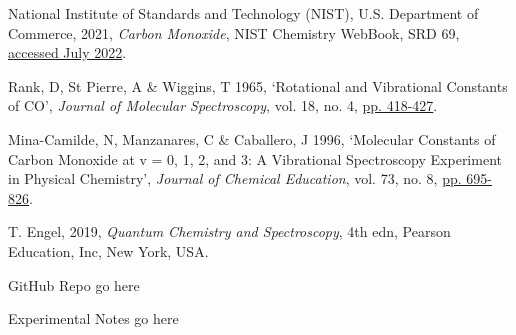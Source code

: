 \documentclass[aps,prl,reprint,10pt,amsmath,amssymb,superscriptaddress,a4paper]{revtex4-2}
\begin{document}
\begin{thebibliography}{99}

 National Institute of Standards and Technology (NIST), U.S. Department of Commerce, 2021, {\it Carbon Monoxide}, NIST Chemistry WebBook, SRD 69, \href{https://webbook.nist.gov/cgi/cbook.cgi?ID=C630080}{accessed July 2022}. 

 Rank, D, St Pierre, A \& Wiggins, T 1965, ‘Rotational and Vibrational Constants of CO’, {\it Journal of Molecular Spectroscopy}, vol. 18, no. 4, \href{https://www.sciencedirect.com/science/article/abs/pii/0022285265900482}{pp. 418-427}.

 Mina-Camilde, N, Manzanares, C \& Caballero, J 1996, ‘Molecular Constants of Carbon Monoxide at v = 0, 1, 2, and 3: A Vibrational Spectroscopy Experiment in Physical Chemistry’, {\it Journal of Chemical Education}, vol. 73, no. 8, \href{https://doi.org/10.1021/ed073p804}{pp. 695-826}. 

 T. Engel, 2019, {\it Quantum Chemistry and Spectroscopy}, 4th edn, Pearson Education, Inc, New York, USA.

 GitHub Repo go here

 Experimental Notes go here

\end{thebibliography}
\end{document}
